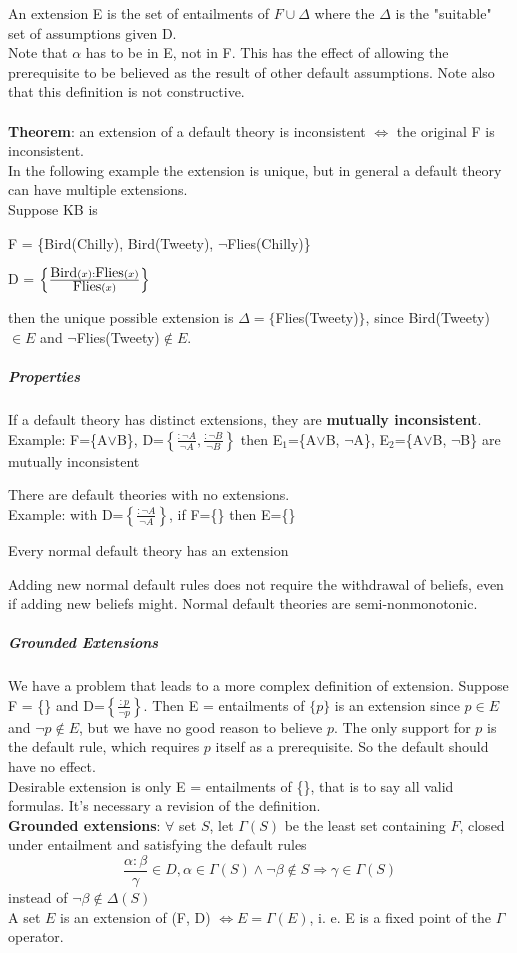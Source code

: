\documentclass[10pt]{report}
\begin{document}
An extension E is the set of entailments of $F\cup\Delta$ where the $\Delta$ is the "suitable" set of assumptions given D.\\
Note that $\alpha$ has to be in E, not in F. This has the effect of allowing the prerequisite to be believed as the result of other default assumptions. Note also that this definition is not constructive.\\\\
\textbf{Theorem}: an extension of a default theory is inconsistent $\Leftrightarrow$ the original F is inconsistent.\\
In the following example the extension is unique, but in general a default theory can have multiple extensions.\\
Suppose KB is 
\begin{list}{}{}
	\item F = \{Bird(Chilly), Bird(Tweety), $\neg$Flies(Chilly)\}
	\item D = $\left\{\frac{\hbox{Bird}(x) : \hbox{Flies}(x)}{\hbox{Flies}(x)}\right\}$
\end{list}
then the unique possible extension is $\Delta = \{$Flies(Tweety)$\}$, since Bird(Tweety)$\in E$ and $\neg$Flies(Tweety)$\not\in E$.
\subparagraph{Properties} \begin{list}{}{}
	\item If a default theory has distinct extensions, they are \textbf{mutually inconsistent}.\\
	Example: F=\{A$\vee$B\}, D=$\left\{\frac{:\neg A}{\neg A}, \frac{:\neg B}{\neg B}\right\}$ then E$_1$=\{A$\vee$B, $\neg$A\}, E$_2$=\{A$\vee$B, $\neg$B\} are mutually inconsistent
	\item There are default theories with no extensions.\\
	Example: with D=$\left\{\frac{:\neg A}{\neg A}\right\}$, if F=\{\} then E=\{\}
	\item Every normal default theory has an extension
	\item Adding new normal default rules does not require the withdrawal of beliefs, even if adding new beliefs might. Normal default theories are semi-nonmonotonic.
\end{list}
\subparagraph{Grounded Extensions} We have a problem that leads to a more complex definition of extension. Suppose F = \{\} and D=$\left\{\frac{:p}{\neg p}\right\}$. Then E = entailments of $\{p\}$ is an extension since $p\in E$ and $\neg p\not\in E$, but we have no good reason to believe $p$. The only support for $p$ is the default rule, which requires $p$ itself as a prerequisite. So the default should have no effect.\\
Desirable extension is only E = entailments of \{\}, that is to say all valid formulas. It's necessary a revision of the definition.\\
\textbf{Grounded extensions}: $\forall$ set $S$, let $\Gamma(S)$ be the least set containing $F$, closed under entailment and satisfying the default rules $$\frac{\alpha : \beta}{\gamma} \in D, \alpha\in \Gamma(S) \wedge \neg\beta\not\in S \Rightarrow \gamma\in \Gamma(S)$$
instead of $\neg\beta\not\in\Delta(S)$\\
A set $E$ is an extension of (F, D) $\Leftrightarrow E = \Gamma(E)$, i. e. E is a fixed point of the $\Gamma$ operator.
\end{document}

